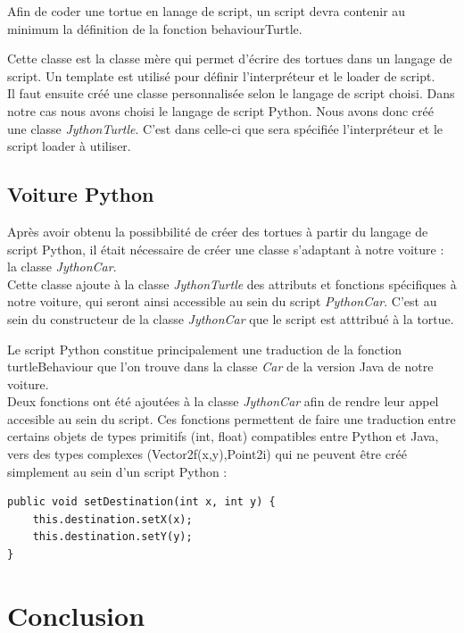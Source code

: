 \documentclass[a4paper,12pt]{report}
\begin{document}
Afin de coder une tortue en lanage de script, un script devra contenir au minimum la définition de la fonction behaviourTurtle.

Cette classe est la classe mère qui permet d'écrire des tortues dans un langage de script. Un template est utilisé pour définir l'interpréteur et le loader de script. \\

Il faut ensuite créé une classe personnalisée selon le langage de script choisi. Dans notre cas nous avons choisi le langage de script Python. Nous avons donc créé une classe \emph{JythonTurtle}. C'est dans celle-ci que sera spécifiée l'interpréteur et le script loader à utiliser.

\section{Voiture Python}

Après avoir obtenu la possibbilité de créer des tortues à partir du langage de script Python, il était nécessaire de créer une classe s'adaptant à notre voiture : la classe \emph{JythonCar}.\\

Cette classe ajoute à la classe \emph{JythonTurtle} des attributs et fonctions spécifiques à notre voiture, qui seront ainsi accessible au sein du script \emph{PythonCar}. C'est au sein du constructeur de la classe \emph{JythonCar} que le script est atttribué à la tortue.

Le script Python constitue principalement une traduction de la fonction turtleBehaviour que l'on trouve dans la classe \emph{Car} de la version Java de notre voiture. \\

Deux fonctions ont été ajoutées à la classe \emph{JythonCar} afin de rendre leur appel accesible au sein du script. Ces fonctions permettent de faire une traduction entre certains objets de types primitifs (int, float) compatibles entre Python et Java, vers des types complexes (Vector2f(x,y),Point2i) qui ne peuvent être créé simplement au sein d'un script Python :

\begin{verbatim}
public void setDestination(int x, int y) {
    this.destination.setX(x);
    this.destination.setY(y);
}
\end{verbatim}

\chapter{Conclusion}
\end{document}
